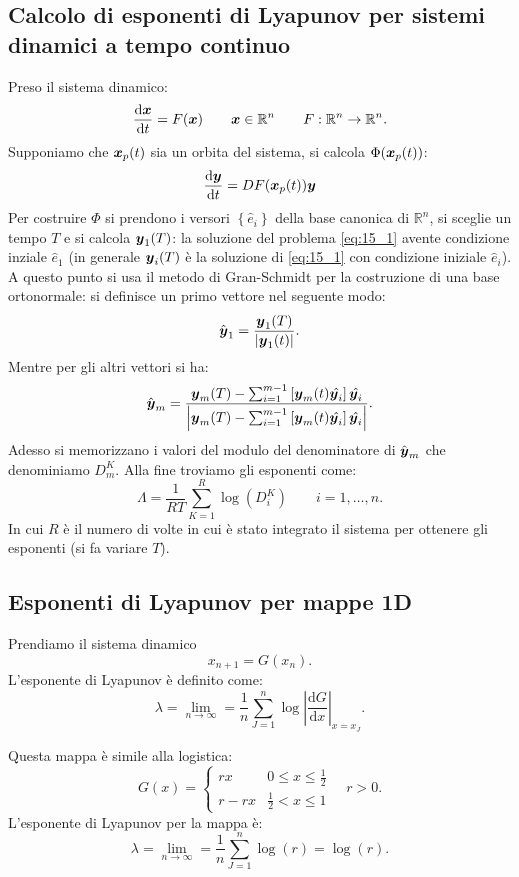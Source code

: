 \subsection{Calcolo di esponenti di Lyapunov per sistemi dinamici a tempo continuo}%
Preso il sistema dinamico:
\[
    \frac{\text{d} \boldsymbol{x}}{\text{d} t} = F(\boldsymbol{x}) \qquad  \boldsymbol{x}\in \mathbb{R}^n \qquad F:\mathbb{R}^n\to \mathbb{R}^n
.\] 
Supponiamo che $\boldsymbol{x}_p(t)$ sia un orbita del sistema,  si calcola $\Phi (\boldsymbol{x}_p(t))$:
\begin{equation}
    \frac{\text{d} \boldsymbol{y}}{\text{d} t} = DF(\boldsymbol{x}_p(t) ) \boldsymbol{y}
    \label{eq:15_1}
\end{equation}
Per costruire $\Phi$ si prendono i versori $\left\{\hat{e}_i\right\}$ della base canonica di $\mathbb{R}^n$, si sceglie un tempo $T$ e si calcola $\boldsymbol{y}_1(T)$: la soluzione del problema \ref{eq:15_1} avente condizione inziale $\hat{e}_1$ (in generale $\boldsymbol{y}_i(T)$ è la soluzione di \ref{eq:15_1} con condizione iniziale $\hat{e}_i$).\\
A questo punto si usa il metodo di Gran-Schmidt per la costruzione di una base ortonormale: si definisce un primo vettore nel seguente modo:
\[
    \hat{\boldsymbol{y}}_1 = \frac{\boldsymbol{y}_1(T) }{\left|\boldsymbol{y}_1(t)\right|} 
.\] 
Mentre per gli altri vettori si ha:
\[
    \hat{\boldsymbol{y}}_m= 
    \frac{\boldsymbol{y}_m(T) - \sum_{i= 1}^{m-1} \left[\boldsymbol{y}_m(t) \hat{\boldsymbol{y}_i}\right]\hat{\boldsymbol{y}_i}}{\left|\boldsymbol{y}_m(T) - \sum_{i= 1}^{m-1} \left[\boldsymbol{y}_m(t) \hat{\boldsymbol{y}_i}\right]\hat{\boldsymbol{y}_i}\right|}
.\] 
Adesso si memorizzano i valori del modulo del denominatore di $\hat{\boldsymbol{y}}_m$ che denominiamo $D_m^K$. Alla fine troviamo gli esponenti come:
\[
    \Lambda  = \frac{1}{RT}\sum_{K=1}^{R} \log (D_i^K) \qquad  i =1, \ldots, n
.\] 
In cui $R$ è il numero di volte in cui è stato integrato il sistema per ottenere gli esponenti (si fa variare $T$).
\subsection{Esponenti di Lyapunov per mappe 1D}%
Prendiamo il sistema dinamico
\[
    x_{n+1}= G(x_{n}) 
.\] 
L'esponente di Lyapunov è definito come:
\[
    \lambda  = \lim_{n \to \infty} = \frac{1}{n}\sum_{J=1}^{n} \log\left|\frac{\text{d} G}{\text{d} x} \right|_{x = x_J}
.\] 
\begin{exmp}
    Questa mappa è simile alla logistica:
    \[
	G(x) =
	\begin{cases}
	    rx & 0 \le x \le \frac{1}{2}\\
	    r-rx & \frac{1}{2}<x\le 1
	\end{cases}
	\quad  r>0
    .\] 
    L'esponente di Lyapunov per la mappa è:
    \[
        \lambda  = \lim_{n \to \infty} = 
	\frac{1}{n}\sum_{J=1}^{n} \log (r) = \log (r) 
    .\] 
\end{exmp}
\noindent

